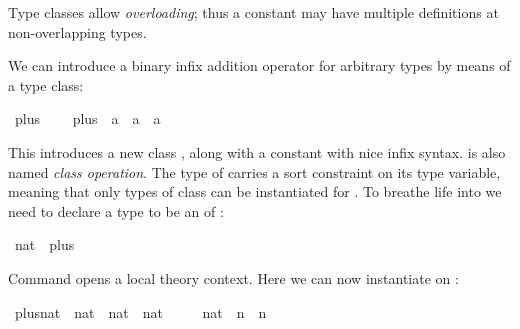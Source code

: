 %
\begin{isabellebody}%
\def\isabellecontext{Overloading}%
%
\isadelimtheory
%
\endisadelimtheory
%
\isatagtheory
%
\endisatagtheory
{\isafoldtheory}%
%
\isadelimtheory
%
\endisadelimtheory
%
\begin{isamarkuptext}%
Type classes allow \emph{overloading}; thus a constant may
have multiple definitions at non-overlapping types.%
\end{isamarkuptext}%
\isamarkuptrue%
%
\isamarkuptrue%
%
\begin{isamarkuptext}%
We can introduce a binary infix addition operator \isa{{\isasymotimes}}
for arbitrary types by means of a type class:%
\end{isamarkuptext}%
\isamarkuptrue%
\isamarkupfalse%
\ plus\ {\isacharequal}\isanewline
\ \ \ plus\ {\isacharcolon}{\isacharcolon}\ {\isachardoublequoteopen}{\isacharprime}a\ {\isasymRightarrow}\ {\isacharprime}a\ {\isasymRightarrow}\ {\isacharprime}a{\isachardoublequoteclose}\ {\isacharparenleft}\ {\isachardoublequoteopen}{\isasymoplus}{\isachardoublequoteclose}\ {}{}{\isacharparenright}%
\begin{isamarkuptext}%
\noindent This introduces a new class ,
along with a constant  with nice infix syntax.
 is also named \emph{class operation}.  The type
of  carries a sort constraint  on its type variable, meaning that only types of class
 can be instantiated for .
To breathe life into  we need to declare a type
to be an  of :%
\end{isamarkuptext}%
\isamarkuptrue%
\isamarkupfalse%
\ nat\ {\isacharcolon}{\isacharcolon}\ plus\isanewline
{}%
\begin{isamarkuptext}%
\noindent Command  opens a local
theory context.  Here we can now instantiate  on
:%
\end{isamarkuptext}%
\isamarkuptrue%
\isamarkupfalse%
\ plus{\isacharunderscore}nat\ {\isacharcolon}{\isacharcolon}\ {\isachardoublequoteopen}nat\ {\isasymRightarrow}\ nat\ {\isasymRightarrow}\ nat{\isachardoublequoteclose}\ \isanewline
\ \ \ \ {\isachardoublequoteopen}{\isacharparenleft}{}{\isacharcolon}{\isacharcolon}nat{\isacharparenright}\ {\isasymoplus}\ n\ {\isacharequal}\ n{\isachardoublequoteclose}\isanewline

\end{isabellebody}
